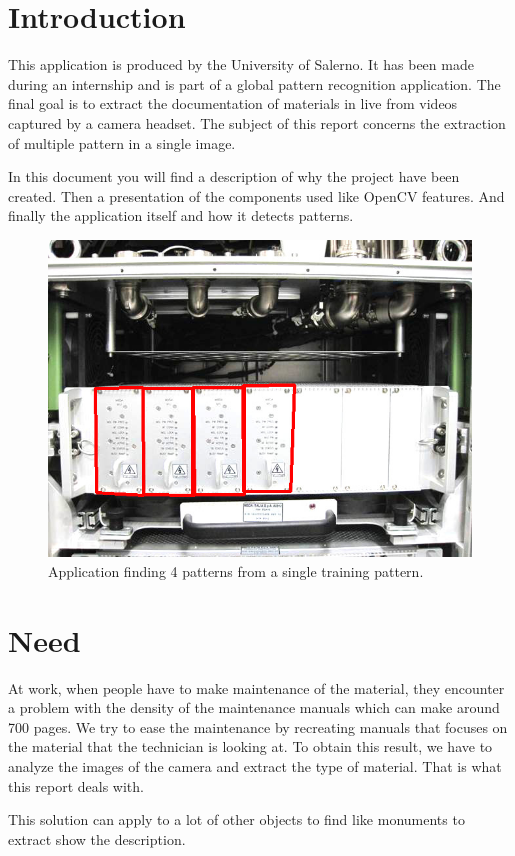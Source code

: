 \documentclass[english,a4paper,11pt]{report}
\begin{document}
	\tableofcontents
	\newpage
	
	
	\chapter{Introduction}
		\par This application is produced by the University of Salerno. It has been made during an internship and is part of a global pattern recognition application. The final goal is to extract the documentation of materials in live from videos captured by a camera headset. The subject of this report concerns the extraction of multiple pattern in a single image.
		\par In this document you will find a description of why the project have been created. Then a presentation of the components used like OpenCV features. And finally the application itself and how it detects patterns.\\
		
		\begin{figure}[h]
			\begin{center}
				\includegraphics[scale=0.7]{images_not_compressed/intro.png}
				\caption{Application finding 4 patterns from a single training pattern.}
			\end{center}
		\end{figure}
		
		
	
	\chapter{Need}
		\par At work, when people have to make maintenance of the material, they encounter a problem with the density of the maintenance manuals which can make around 700 pages. We try to ease the maintenance by recreating manuals that focuses on the material that the technician is looking at. To obtain this result, we have to analyze the images of the camera and extract the type of material. That is what this report deals with.
		\par This solution can apply to a lot of other objects to find like monuments to extract show the description. \\
		
\end{document}
